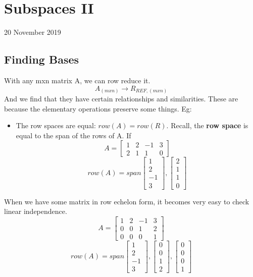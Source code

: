 \documentclass[twocolumn,10pt]{article}
\begin{document}
  \section{Subspaces II}
  20 November 2019
  \subsection{Finding Bases}
  With any mxn matrix A, we can row reduce it.
  $$A_{(mxn)} \to R_{REF, (mxn)}$$ And we find that they have certain relationships and similarities. These are because the elementary operations preserve some things. Eg:
  \begin{itemize}
    \item The row spaces are equal: $row(A) = row(R)$. Recall, the \textbf{row space} is equal to the span of the rows of A. If $$A = \begin{bmatrix}1 &2 &-1& 3 \\ 2 & 1 & 1 & 0 \end{bmatrix}$$
    $$row(A) = span \begin{bmatrix}1 \\ 2 \\ -1 \\3 \end{bmatrix}, \begin{bmatrix}2 \\ 1 \\ 1 \\ 0 \end{bmatrix}$$
  \end{itemize}

  When we have some matrix in row echelon form, it becomes very easy to check linear independence. $$A = \begin{bmatrix}1 &2 &-1& 3 \\ 0 & 0 & 1 & 2 \\ 0 & 0 & 0 & 1 \end{bmatrix}$$
    $$row(A) = span \begin{bmatrix}1 \\ 2 \\ -1 \\ 3
    \end{bmatrix}, \begin{bmatrix} 0\\ 0 \\ 1 \\ 2 \end{bmatrix}, \begin{bmatrix} 0\\ 0 \\ 0 \\1 \end{bmatrix}$$
\end{document}
